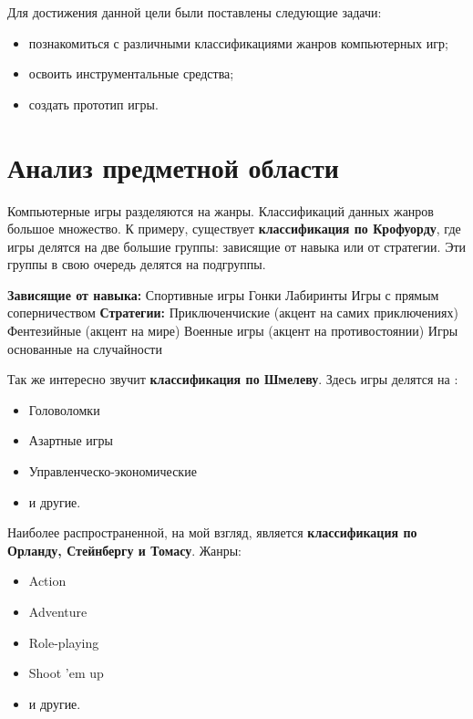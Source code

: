 \documentclass[14pt, titlepage,fleqn,a4paper]{extarticle}
\begin{document}
Для достижения данной цели были поставлены следующие задачи:
\begin{itemize}
\item познакомиться с различными классификациями жанров компьютерных игр; 
\item освоить инструментальные средства;
\item создать прототип игры.
\end{itemize}

\newpage
\section*{Анализ предметной области}
	Компьютерные игры разделяются на жанры. Классификаций данных жанров большое множество.
К примеру, существует \textbf{классификация по Крофуорду}, где игры делятся на две большие группы: зависящие от навыка или от стратегии.
Эти группы в свою очередь  делятся на подгруппы.

	 
	\begin{outline}
	    \1\textbf{Зависящие от навыка:}
    		\2 Спортивные игры
    		\2 Гонки
    		\2 Лабиринты
    		\2 Игры с прямым соперничеством
    	\1\textbf{Стратегии:}
    	    \2 Приключенчиские (акцент на самих приключениях)
    		\2 Фентезийные (акцент на мире)
    		\2 Военные игры (акцент на противостоянии)
    		\2 Игры основанные на случайности
	\end{outline}

Так же интересно звучит \textbf{классификация по Шмелеву}.
Здесь игры делятся на :
\begin{itemize}
	\item Головоломки
	\item Азартные игры
	\item Управленческо-экономические
	\item и другие.
\end{itemize}

Наиболее распространенной, на мой взгляд, является \textbf{классификация по Орланду, Стейнбергу и Томасу}.
	Жанры:
	\begin{itemize}
		\item Action
		\item Adventure
		\item Role-playing
		\item Shoot 'em up
		\item и другие.
	\end{itemize}
\end{document}
